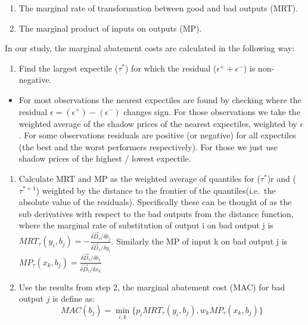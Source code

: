 \documentclass[
  12pt,
]{article}
\providecommand{\tightlist}{%
  \setlength{\itemsep}{0pt}\setlength{\parskip}{0pt}}
\begin{document}
\begin{enumerate}
\def\labelenumi{\arabic{enumi}.}
\tightlist
\item
  The marginal rate of transformation between good and bad outputs (MRT).\\
\item
  The marginal product of inputs on outputs (MP).
\end{enumerate}

In our study, the marginal abatement costs are calculated in the following way:

\begin{enumerate}
\def\labelenumi{\arabic{enumi}.}
\tightlist
\item
  Find the largest expectile (\(\tau^{*}\)) for which the residual (\(\epsilon^+ + \epsilon^-\)) is non-negative.\\
\end{enumerate}

\begin{itemize}
\tightlist
\item
  For most observations the nearest expectiles are found by checking where the residual \(\epsilon = (\epsilon^+) - (\epsilon^-)\) changes sign. For those observations we take the weighted average of the shadow prices of the nearest expectiles, weighted by \(\epsilon\). For some observations residuals are positive (or negative) for all expectiles (the best and the worst performers respectively). For those we just use shadow prices of the highest / lowest expectile.
\end{itemize}

\begin{enumerate}
\def\labelenumi{\arabic{enumi}.}
\setcounter{enumi}{1}
\item
  Calculate MRT and MP as the weighted average of quantiles for (\(\tau^{*}\))r and (\(\tau^{*+1}\)) weighted by the distance to the frontier of the quantiles(i.e.~the absolute value of the residuals). Specifically these can be thought of as the sub derivatives with respect to the bad outputs from the distance function, where the marginal rate of substitution of output i on bad output j is \(MRT_{\tau}(y_{i},b_{j})=-\frac{\delta \vec{D}_{\tau}/\delta b_{j}}{\delta \vec{D}_{\tau}/\delta y_{i}}\). Similarly the MP of input k on bad output j is \(MP_{\tau}(x_{k},b_{j})=\frac{\delta \vec{D}_{\tau}/\delta b_{j}}{\delta \vec{D}_{\tau}/\delta x_{k}}\)
\item
  Use the results from step 2, the marginal abatement cost (MAC) for bad output \(j\) is define as:
  \begin{equation}
  MAC(b_{j})=\displaystyle \min_{i,k}\{p_{i}MRT_{\tau}(y_{i},b_{j}), w_{k}MP_{\tau}(x_{k},b_{j})\}
  \label{eq:mac}
  \end{equation}
\end{enumerate}
\end{document}

